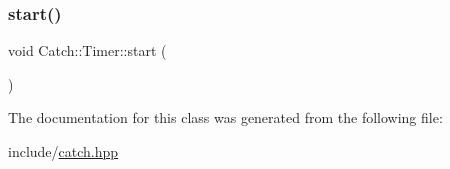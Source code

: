 \mbox{\label{class_catch_1_1_timer_a0a56e879e43f36c102bf9ea8b5fc8b72}} 
\subsubsection{\texorpdfstring{start()}{start()}}
{\footnotesize\ttfamily void Catch\+::\+Timer\+::start (\begin{DoxyParamCaption}{ }\end{DoxyParamCaption})}



The documentation for this class was generated from the following file\+:\begin{DoxyCompactItemize}
\item 
include/\mbox{\hyperlink{catch_8hpp}{catch.\+hpp}}\end{DoxyCompactItemize}
